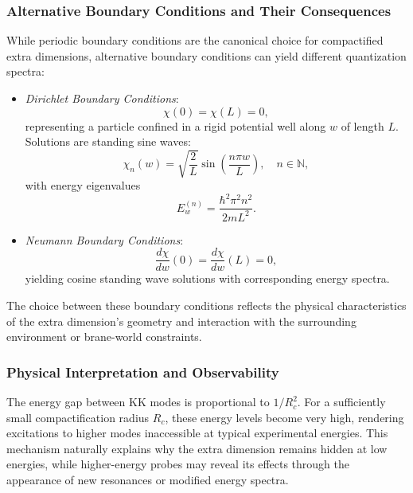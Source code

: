 \documentclass[12pt]{article}
\begin{document}
\subsubsection*{Alternative Boundary Conditions and Their Consequences}

While periodic boundary conditions are the canonical choice for compactified extra dimensions, alternative boundary conditions can yield different quantization spectra:

\begin{itemize}
    \item \emph{Dirichlet Boundary Conditions}:
    \begin{equation}
        \chi(0) = \chi(L) = 0,
    \end{equation}
    representing a particle confined in a rigid potential well along \(w\) of length \(L\). Solutions are standing sine waves:
    \begin{equation}
        \chi_n(w) = \sqrt{\frac{2}{L}} \sin \left( \frac{n \pi w}{L} \right), \quad n \in \mathbb{N},
    \end{equation}
    with energy eigenvalues
    \begin{equation}
        E_w^{(n)} = \frac{\hbar^2 \pi^2 n^2}{2m L^2}.
    \end{equation}
    
    \item \emph{Neumann Boundary Conditions}:
    \begin{equation}
        \frac{d\chi}{dw}(0) = \frac{d\chi}{dw}(L) = 0,
    \end{equation}
    yielding cosine standing wave solutions with corresponding energy spectra.
\end{itemize}

The choice between these boundary conditions reflects the physical characteristics of the extra dimension’s geometry and interaction with the surrounding environment or brane-world constraints.

\subsubsection*{Physical Interpretation and Observability}

The energy gap between KK modes is proportional to \(1/R_c^2\). For a sufficiently small compactification radius \(R_c\), these energy levels become very high, rendering excitations to higher modes inaccessible at typical experimental energies. This mechanism naturally explains why the extra dimension remains hidden at low energies, while higher-energy probes may reveal its effects through the appearance of new resonances or modified energy spectra.
\end{document}
